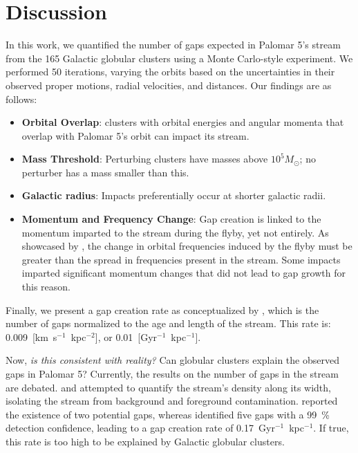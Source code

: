 \documentclass[draft]{aa}
\begin{document}
\section{Discussion}


  In this work, we quantified the number of gaps expected in Palomar 5's stream from the 165 Galactic globular clusters using a Monte Carlo-style experiment. We performed 50 iterations, varying the orbits based on the uncertainties in their observed proper motions, radial velocities, and distances. Our findings are as follows:

  \begin{itemize}
    \item \textbf{Orbital Overlap}: clusters with orbital energies and angular momenta that overlap with Palomar 5's orbit can impact its stream.
    \item \textbf{Mass Threshold}: Perturbing clusters have masses above $10^5 M_\odot$; no perturber has a mass smaller than this.
    \item \textbf{Galactic radius}: Impacts preferentially occur at shorter galactic radii.
    \item \textbf{Momentum and Frequency Change}: Gap creation is linked to the momentum imparted to the stream during the flyby, yet not entirely. As showcased by \citet{2016MNRAS.457.3817S}, the change in orbital frequencies induced by the flyby must be greater than the spread in frequencies present in the stream. Some impacts imparted significant momentum changes that did not lead to gap growth for this reason.
  \end{itemize}

  Finally, we present a gap creation rate as conceptualized by \citet{2012ApJ...748...20C}, which is the number of gaps normalized to the age and length of the stream. This rate is: 0.009~[km~s$^{-1}$~kpc$^{-2}$], or 0.01~[Gyr$^{-1}$~kpc$^{-1}$].


  Now, \textit{is this consistent with reality?} Can globular clusters explain the observed gaps in Palomar 5? Currently, the results on the number of gaps in the stream are debated. \citet{2012ApJ...760...75C} and \citet{2020ApJ...889...70B} attempted to quantify the stream's density along its width, isolating the stream from background and foreground contamination. \citet{2020ApJ...889...70B} reported the existence of two potential gaps, whereas \citet{2012ApJ...760...75C} identified five gaps with a 99~\% detection confidence, leading to a gap creation rate of 0.17~Gyr$^{-1}$~kpc$^{-1}$. If true, this rate is too high to be explained by Galactic globular clusters.
\end{document}
